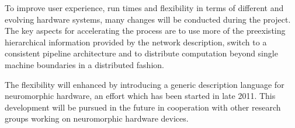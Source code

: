 \documentclass[12pt,oneside]{scrartcl}
\begin{document}
To improve user experience, run times and flexibility in terms of different and evolving hardware systems, many changes will be conducted during the project.
%
The key aspects for accelerating the process are to use more of the preexisting hierarchical information provided by the network description, switch to a consistent pipeline architecture and to distribute computation beyond single machine boundaries in a distributed fashion.

The flexibility will enhanced by introducing a generic description language for neuromorphic hardware, an effort which has been started in late 2011.
%
This development will be pursued in the future in cooperation with other research groups working on neuromorphic hardware devices.


\end{document}
